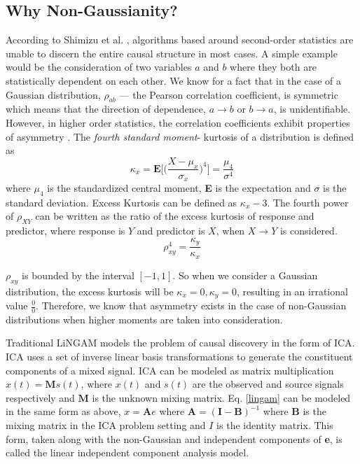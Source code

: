 \documentclass{article}
\begin{document}
\subsection{Why Non-Gaussianity?}
According to Shimizu et al. \cite{JMLR:v7:shimizu06a}, algorithms based around second-order statistics are unable to discern the entire causal structure in most cases. A simple example would be the consideration of two variables $a$ and $b$ where they both are statistically dependent on each other. We know for a fact that in the case of a Gaussian distribution, $\rho_{ab}$ — the Pearson correlation coefficient, is symmetric which means that the direction of dependence, $a \rightarrow b$ or $b \rightarrow a$, is unidentifiable. However, in higher order statistics, the correlation coefficients exhibit properties of asymmetry \cite{Dodge2001,Dodge2009}.
The \textit{fourth standard moment}- kurtosis of a distribution is defined as 
\begin{equation}
    \kappa_x = \textbf{E}\Big[\Big(\frac{X-\mu_x}{\sigma_x}\Big)^4\Big] = \frac{\mu_4}{\sigma^4}
\end{equation}
where $\mu_4$ is the standardized central moment, \textbf{E} is the expectation and $\sigma$ is the standard deviation. 
Excess Kurtosis can be defined as $\kappa_x-3$. The fourth power of $\rho_{XY}$ can be written as the ratio of the excess kurtosis of response and predictor, where response is $Y$ and predictor is $X$, when $X \rightarrow Y$ is considered.
\begin{equation}
\rho_{xy}^4 = \frac{\kappa_y}{\kappa_x}
\end{equation}

$\rho_{xy}$ is bounded by the interval $[-1,1]$.
So when we consider a Gaussian distribution, the excess kurtosis will be $\kappa_x = 0, \kappa_y = 0$, resulting in an irrational value $\frac{0}{0}$. Therefore, we know that asymmetry exists in the case of non-Gaussian distributions when higher moments are taken into consideration.


Traditional LiNGAM models the problem of causal discovery in the form of ICA. ICA uses a set of inverse linear basis transformations to generate the constituent components of a mixed signal. ICA can be modeled as matrix multiplication $x(t) = \textbf{M}s(t)$, where $x(t)$ and $s(t)$ are the observed and source signals respectively and $\textbf{M}$ is the unknown mixing matrix.
Eq. \eqref{lingam} can be modeled in the same form as above, $x = \textbf{A}e$ where $\textbf{A} = (\textbf{I}-\textbf{B})^{-1}$ where $\textbf{B}$ is the mixing matrix in the ICA problem setting and $I$ is the identity matrix. This form, taken along with the non-Gaussian and independent components of \textbf{e}, is called the linear independent component analysis model.
\end{document}
